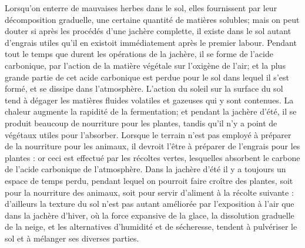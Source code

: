 Lorsqu'on enterre de mauvaises herbes dans le sol, elles fournissent par leur décomposition graduelle, une certaine quantité de matières solubles; mais on peut douter si après les procédés d'une jachère complette, il existe dans le sol autant d'engrais utiles qu'il en existoit immédiatement après le premier labour.
Pendant tout le temps que durent les opérations de la jachère, il se forme de l'acide carbonique, par l'action de la matière végétale sur l'oxigène de l'air; et la plus grande partie de cet acide carbonique est perdue pour le sol dans lequel il s'est formé, et se dissipe dans l'atmosphère.
L'action du soleil sur la surface du sol tend à dégager les matières fluides volatiles et gazeuses qui y sont contenues. La chaleur augmente la rapidité de la fermentation; et pendant la jachère d'été, il se produit beaucoup de nourriture pour les plantes, tandis qu'il n'y a point de végétaux utiles pour l'absorber.
Lorsque le terrain n'est pas employé à préparer de la nourriture pour les animaux, il\setcounter{page}{282} devroit l'être à préparer de l'engrais pour les plantes : or ceci est effectué par les récoltes vertes, lesquelles absorbent le carbone de l'acide carbonique de l'atmosphère. Dans la jachère d'été il y a toujours un espace de temps perdu, pendant lequel on pourroit faire croître des plantes, soit pour la nourriture des animaux, soit pour servir d'aliment à la récolte suivante : d'ailleurs la texture du sol n'est pas autant améliorée par l'exposition à l'air que dans la jachère d'hiver, où la force expansive de la glace, la dissolution graduelle de la neige, et les alternatives d'humidité et de sécheresse, tendent à pulvériser le sol et à mélanger ses diverses parties.

